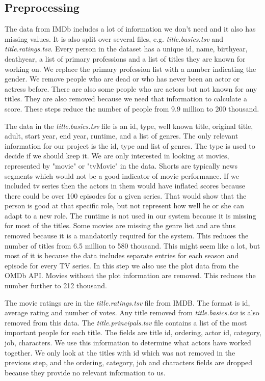 \subsection{Preprocessing}

The data from IMDb includes a lot of information we don’t need and it also has missing values. It is also split over several files, e.g. \textit{title.basics.tsv} and \textit{title.ratings.tsv}. Every person in the dataset has a unique id, name, birthyear, deathyear, a list of primary professions and a list of titles they are known for working on. We replace the primary profession list with a number indicating the gender. We remove people who are dead or who has never been an actor or actress before. There are also some people who are actors but not known for any titles. They are also removed because we need that information to calculate a score. These steps reduce the number of people from 9.9 million to 200 thousand.

The data in the \textit{title.basics.tsv} file is an id, type, well known title, original title, adult, start year, end year, runtime, and a list of genres. The only relevant information for our project is the id, type and list of genres. The type is used to decide if we should keep it. We are only interested in looking at movies, represented by "movie" or "tvMovie" in the data. Shorts are typically news segments which would not be a good indicator of movie performance. If we included tv series then the actors in them would have inflated scores because there could be over 100 episodes for a given series. That would show that the person is good at that specific role, but not represent how well he or she can adapt to a new role. The runtime is not used in our system because it is missing for most of the titles. Some movies are missing the genre list and are thus removed because it is a mandatorily required for the system. This reduces the number of titles from 6.5 million to 580 thousand. This might seem like a lot, but most of it is because the data includes separate entries for each season and episode for every TV series. In this step we also use the plot data from the OMDb API. Movies without the plot information are removed. This reduces the number further to 212 thousand.

The movie ratings are in the \textit{title.ratings.tsv} file from IMDB. The format is id, average rating and number of votes. Any title removed from \textit{title.basics.tsv} is also removed from this data. The \textit{title.principals.tsv} file contains a list of the most important people for each title. The fields are title id, ordering, actor id, category, job, characters. We use this information to determine what actors have worked together. We only look at the titles with id which was not removed in the previous step, and the ordering, category, job and characters fields are dropped because they provide no relevant information to us.


